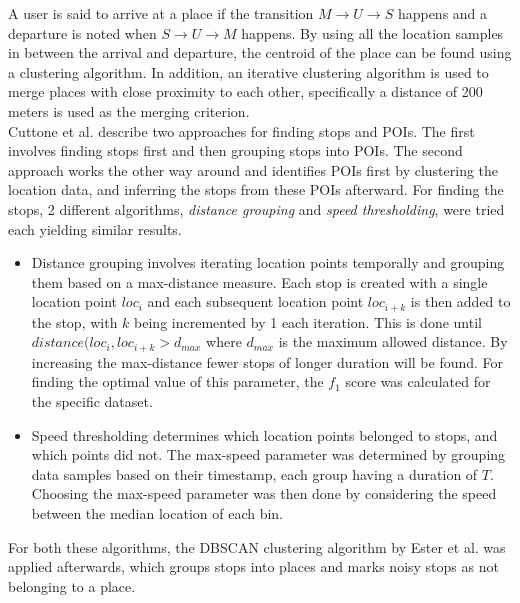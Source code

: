 A user is said to arrive at a place if the transition $M \rightarrow U \rightarrow S$ happens and a departure is noted when $S \rightarrow U \rightarrow M$ happens. By using all the location samples in between the arrival and departure, the centroid of the place can be found using a clustering algorithm. In addition, an iterative clustering algorithm is used to merge places with close proximity to each other, specifically a distance of 200 meters is used as the merging criterion. \\ 


Cuttone et al. describe two approaches for finding stops and POIs. The first involves finding stops first and then grouping stops into POIs. The second approach works the other way around and identifies POIs first by clustering the location data, and inferring the stops from these POIs afterward. For finding the stops, 2 different algorithms, \textit{distance grouping} and \textit{speed thresholding}, were tried each yielding similar results.

\begin{itemize}
    \item Distance grouping involves iterating location points temporally and grouping them based on a max-distance measure. Each stop is created with a single location point $loc_{i}$ and each subsequent location point $loc_{i+k}$ is then added to the stop, with $k$ being incremented by 1 each iteration. This is done until $distance(loc_{i}, loc_{i+k} > d_{max}$ where $d_{max}$ is the maximum allowed distance. By increasing the max-distance fewer stops of longer duration will be found. For finding the optimal value of this parameter, the $f_1$ score was calculated for the specific dataset.  

    \item Speed thresholding determines which location points belonged to stops, and which points did not. The max-speed parameter was determined by grouping data samples based on their timestamp, each group having a duration of $T$. Choosing the max-speed parameter was then done by considering the speed between the median location of each bin.  
\end{itemize}

For both these algorithms, the DBSCAN clustering algorithm by Ester et al. \cite{density-based-1996} was applied afterwards, which groups stops into places and marks noisy stops as not belonging to a place.\\

